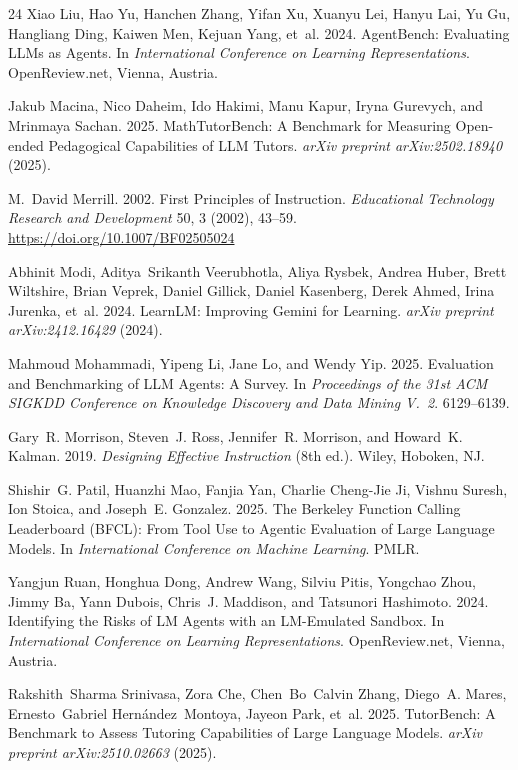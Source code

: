 \documentclass[sigconf,preprint]{acmart}
\begin{document}
\begin{thebibliography}{24}
Xiao Liu, Hao Yu, Hanchen Zhang, Yifan Xu, Xuanyu Lei, Hanyu Lai, Yu Gu, Hangliang Ding, Kaiwen Men, Kejuan Yang, et~al. 2024. AgentBench: Evaluating LLMs as Agents. In \emph{International Conference on Learning Representations}. OpenReview.net, Vienna, Austria.

Jakub Macina, Nico Daheim, Ido Hakimi, Manu Kapur, Iryna Gurevych, and Mrinmaya Sachan. 2025. MathTutorBench: A Benchmark for Measuring Open-ended Pedagogical Capabilities of LLM Tutors. \emph{arXiv preprint arXiv:2502.18940} (2025).

M.~David Merrill. 2002. First Principles of Instruction. \emph{Educational Technology Research and Development} 50, 3 (2002), 43--59. \url{https://doi.org/10.1007/BF02505024}

Abhinit Modi, Aditya~Srikanth Veerubhotla, Aliya Rysbek, Andrea Huber, Brett Wiltshire, Brian Veprek, Daniel Gillick, Daniel Kasenberg, Derek Ahmed, Irina Jurenka, et~al. 2024. LearnLM: Improving Gemini for Learning. \emph{arXiv preprint arXiv:2412.16429} (2024).

Mahmoud Mohammadi, Yipeng Li, Jane Lo, and Wendy Yip. 2025. Evaluation and Benchmarking of LLM Agents: A Survey. In \emph{Proceedings of the 31st ACM SIGKDD Conference on Knowledge Discovery and Data Mining V.~2}. 6129--6139.

Gary~R. Morrison, Steven~J. Ross, Jennifer~R. Morrison, and Howard~K. Kalman. 2019. \emph{Designing Effective Instruction} (8th ed.). Wiley, Hoboken, NJ.

Shishir~G. Patil, Huanzhi Mao, Fanjia Yan, Charlie Cheng-Jie Ji, Vishnu Suresh, Ion Stoica, and Joseph~E. Gonzalez. 2025. The Berkeley Function Calling Leaderboard (BFCL): From Tool Use to Agentic Evaluation of Large Language Models. In \emph{International Conference on Machine Learning}. PMLR.

Yangjun Ruan, Honghua Dong, Andrew Wang, Silviu Pitis, Yongchao Zhou, Jimmy Ba, Yann Dubois, Chris~J. Maddison, and Tatsunori Hashimoto. 2024. Identifying the Risks of LM Agents with an LM-Emulated Sandbox. In \emph{International Conference on Learning Representations}. OpenReview.net, Vienna, Austria.

Rakshith~Sharma Srinivasa, Zora Che, Chen~Bo~Calvin Zhang, Diego~A. Mares, Ernesto~Gabriel Hern\'{a}ndez~Montoya, Jayeon Park, et~al. 2025. TutorBench: A Benchmark to Assess Tutoring Capabilities of Large Language Models. \emph{arXiv preprint arXiv:2510.02663} (2025).


\end{thebibliography}
\end{document}
